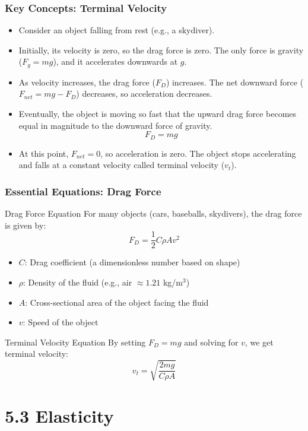 \documentclass{beamer}
\begin{document}
\begin{frame}
\frametitle{Key Concepts: Terminal Velocity}
\begin{itemize}
    \item Consider an object falling from rest (e.g., a skydiver). \pause
    \item Initially, its velocity is zero, so the drag force is zero. The only force is gravity ($F_g = mg$), and it accelerates downwards at $g$. \pause
    \item As velocity increases, the drag force ($F_D$) increases. The net downward force ($F_{net} = mg - F_D$) decreases, so acceleration decreases. \pause
    \item Eventually, the object is moving so fast that the upward drag force becomes equal in magnitude to the downward force of gravity.
    \[ F_D = mg \] \pause
    \item At this point, $F_{net} = 0$, so acceleration is zero. The object stops accelerating and falls at a constant velocity called \alert{terminal velocity ($v_t$)}.
\end{itemize}
\end{frame}

\begin{frame}
\frametitle{Essential Equations: Drag Force}
\begin{alertblock}{Drag Force Equation}
For many objects (cars, baseballs, skydivers), the drag force is given by:
\[ F_D = \frac{1}{2} C \rho A v^2 \]
\begin{itemize}
    \item $C$: Drag coefficient (a dimensionless number based on shape)
    \item $\rho$: Density of the fluid (e.g., air $\approx 1.21$ kg/m$^3$)
    \item $A$: Cross-sectional area of the object facing the fluid
    \item $v$: Speed of the object
\end{itemize}
\end{alertblock} \pause
\begin{exampleblock}{Terminal Velocity Equation}
By setting $F_D = mg$ and solving for $v$, we get terminal velocity:
\[ v_t = \sqrt{\frac{2mg}{C \rho A}} \]
\end{exampleblock}
\end{frame}

\section{5.3 Elasticity}
\end{document}
